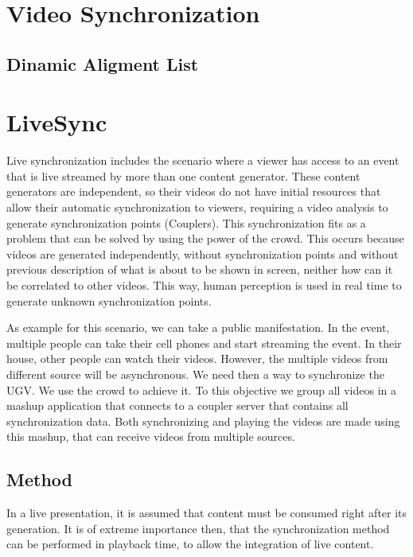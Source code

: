 \documentclass{sig-alternate-05-2015}
\begin{document}
\section{Video Synchronization}


\subsection{Dinamic Aligment List}



\section{LiveSync}
Live synchronization includes the scenario where a viewer has access to an event that is live streamed by more than one content generator. These content generators are independent, so their videos do not have initial resources that allow their automatic synchronization to viewers, requiring a video analysis to generate synchronization points (Couplers). This synchronization fits as a problem that can be solved by using the power of the crowd. This occurs because videos are generated independently, without synchronization points and without previous description of what is about to be shown in screen, neither how can it be correlated to other videos. This way, human perception is used in real time to generate unknown synchronization points. 

As example for this scenario, we can take a public manifestation. In the event, multiple people can take their cell phones and start streaming the event. In their house, other people can watch their videos. However, the multiple videos from different source will be asynchronous. We need then a way to synchronize the UGV. We use the crowd to achieve it. To this objective we group all videos in a mashup application that connects to a coupler server that contains all synchronization data. Both synchronizing and playing the videos are made using this mashup, that can receive videos from multiple sources.

\subsection{Method}
In a live presentation, it is assumed that content must be consumed right after its generation. It is of extreme importance then, that the synchronization method can be performed in playback time, to allow the integration of live content.
\end{document}

